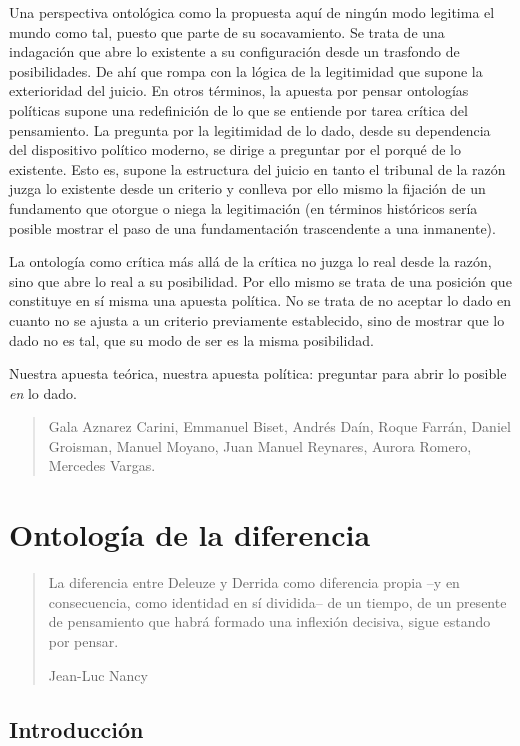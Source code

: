 \documentclass{book}
\begin{document}
Una perspectiva ontológica como la propuesta aquí de ningún modo
legitima el mundo como tal, puesto que parte de su socavamiento. Se
trata de una indagación que abre lo existente a su configuración desde
un trasfondo de posibilidades. De ahí que rompa con la lógica de la
legitimidad que supone la exterioridad del juicio. En otros términos, la
apuesta por pensar ontologías políticas supone una redefinición de lo
que se entiende por tarea crítica del pensamiento. La pregunta por la
legitimidad de lo dado, desde su dependencia del dispositivo político
moderno, se dirige a preguntar por el porqué de lo existente. Esto es,
supone la estructura del juicio en tanto el tribunal de la razón juzga
lo existente desde un criterio y conlleva por ello mismo la fijación de
un fundamento que otorgue o niega la legitimación (en términos
históricos sería posible mostrar el paso de una fundamentación
trascendente a una inmanente).

La ontología como crítica más allá de la crítica no juzga lo real desde
la razón, sino que abre lo real a su posibilidad. Por ello mismo se
trata de una posición que constituye en sí misma una apuesta política.
No se trata de no aceptar lo dado en cuanto no se ajusta a un criterio
previamente establecido, sino de mostrar que lo dado no es tal, que su
modo de ser es la misma posibilidad.

Nuestra apuesta teórica, nuestra apuesta política: preguntar para abrir
lo posible \emph{en} lo dado.

\begin{quote}
Gala Aznarez Carini, Emmanuel Biset, Andrés Daín, Roque Farrán, Daniel
Groisman, Manuel Moyano, Juan Manuel Reynares, Aurora Romero, Mercedes
Vargas.
\end{quote}

\chapter{Ontología de la diferencia}
\author{Emmanuel Biset}

\begin{quote}
La diferencia entre Deleuze y Derrida como diferencia propia --y en
consecuencia, como identidad en sí dividida-- de un tiempo, de un
presente de pensamiento que habrá formado una inflexión decisiva, sigue
estando por pensar.

Jean-Luc Nancy
\end{quote}

\section{Introducción}
\end{document}
